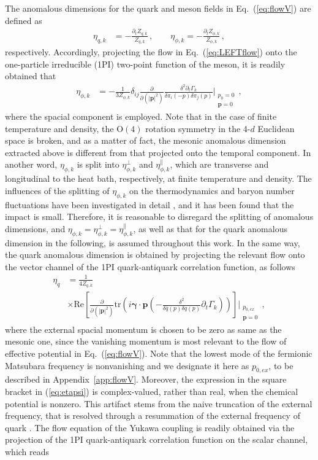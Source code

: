 \documentclass[%
reprint,
superscriptaddress,
showpacs,preprintnumbers,
 amsmath,amssymb,
 aps,
prd,
]{revtex4-1}
\def\Eq#1{Eq.~(\ref{#1})}
\def\eq#1{(\ref{#1})}
\def\app#1{Appendix~\ref{#1}}
\begin{document}
The anomalous dimensions for the quark and meson fields in \Eq{eq:flowV} are defined as
%
\begin{align}
 \eta_{q,k}&=-\frac{\partial_t Z_{q,k}}{Z_{q,k}}\,,\qquad
  \eta_{\phi,k}=-\frac{\partial_t Z_{\phi,k}}{Z_{\phi,k}}\,,
\end{align}
%
respectively. Accordingly, projecting the flow in \Eq{eq:LEFTflow} onto the one-particle irreducible (1PI) two-point function of the meson, it is readily obtained that 
%
\begin{align}
  \eta_{\phi,k}&=-\frac{1}{3Z_{\phi,k}}\delta_{ij}\frac{\partial}{\partial (|\bm{p}|^2)}\frac{\delta^2 \partial_t \Gamma_k}{\delta \pi_i(-p) \delta \pi_j(p)}\Bigg|_{\substack{p_0=0\\ \bm{p}=0}}\,,\label{eq:etaphi}
\end{align}
%
where the spacial component is employed. Note that in the case of finite temperature and density, the $\mathrm{O}(4)$ rotation symmetry in the 4-$d$ Euclidean space is broken, and as a matter of fact, the mesonic anomalous dimension extracted above is different from that projected onto the temporal component. In another word, $\eta_{\phi,k}$ is split into $\eta_{\phi,k}^{\perp}$ and $\eta_{\phi,k}^{\parallel}$, which are transverse and longitudinal to the heat bath, respectively, at finite temperature and density. The influences of the splitting of $\eta_{\phi,k}$ on the thermodynamics and baryon number fluctuations have been investigated in detail \cite{Yin:2019ebz}, and it has been found that the impact is small. Therefore, it is reasonable to disregard the splitting of anomalous dimensions, and $\eta_{\phi,k}=\eta_{\phi,k}^{\perp}=\eta_{\phi,k}^{\parallel}$, as well as that for the quark anomalous dimension in the following, is assumed throughout this work. In the same way, the quark anomalous dimension is obtained by projecting the relevant flow onto the vector channel of the 1PI quark-antiquark correlation function, as follows
%
\begin{align}
  \eta_{q}&=\frac{1}{4 Z_{q,k}}\nonumber\\[2ex]
&\times\mathrm{Re}\left[\frac{\partial}{\partial (|\bm{p}|^2)}\mathrm{tr}
            \left(i \bm{\gamma}\cdot\bm{p}\left(-\frac{\delta^2}{\delta\bar{q}(p)
            \delta q(p)}\partial_t \Gamma_k\right)\right)\right]\Bigg|_{\substack{p_{0,ex}\\ \bm{p}=0}}\,,  \label{eq:etapsi}
\end{align}
%
where the external spacial momentum is chosen to be zero as same as the mesonic one, since the vanishing momentum is most relevant to the flow of effective potential in \Eq{eq:flowV}. Note that the lowest mode of the fermionic Matsubara frequency is nonvanishing and we designate it here as $p_{0,ex}$, to be described in \app{app:flowV}. Moreover, the expression in the square bracket in \eq{eq:etapsi} is complex-valued, rather than real, when the chemical potential is nonzero. This artifact stems from the naive truncation of the external frequency, that is resolved through a resummation of the external frequency of quark  \cite{Fu:2016tey}. The flow equation of the Yukawa coupling is readily obtained via the projection of the 1PI quark-antiquark correlation function on the scalar channel, which reads
\end{document}
